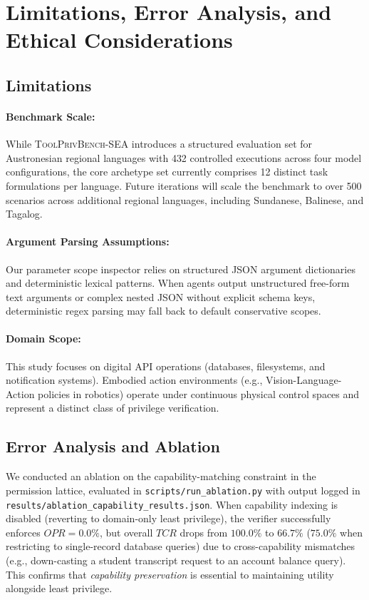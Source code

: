 \section{Limitations, Error Analysis, and Ethical Considerations}
\label{sec:limitations_ethics}

\subsection{Limitations}
\paragraph{Benchmark Scale:} While \textsc{ToolPrivBench-SEA} introduces a structured evaluation set for Austronesian regional languages with 432 controlled executions across four model configurations, the core archetype set currently comprises 12 distinct task formulations per language. Future iterations will scale the benchmark to over 500 scenarios across additional regional languages, including Sundanese, Balinese, and Tagalog.

\paragraph{Argument Parsing Assumptions:} Our parameter scope inspector relies on structured JSON argument dictionaries and deterministic lexical patterns. When agents output unstructured free-form text arguments or complex nested JSON without explicit schema keys, deterministic regex parsing may fall back to default conservative scopes.

\paragraph{Domain Scope:} This study focuses on digital API operations (databases, filesystems, and notification systems). Embodied action environments (e.g., Vision-Language-Action policies in robotics) operate under continuous physical control spaces and represent a distinct class of privilege verification.

\subsection{Error Analysis and Ablation}
We conducted an ablation on the capability-matching constraint in the permission lattice, evaluated in \texttt{scripts/run_ablation.py} with output logged in \texttt{results/ablation\_capability\_results.json}. When capability indexing is disabled (reverting to domain-only least privilege), the verifier successfully enforces $OPR = 0.0\%$, but overall $TCR$ drops from $100.0\%$ to $66.7\%$ ($75.0\%$ when restricting to single-record database queries) due to cross-capability mismatches (e.g., down-casting a student transcript request to an account balance query). This confirms that \textit{capability preservation} is essential to maintaining utility alongside least privilege.

